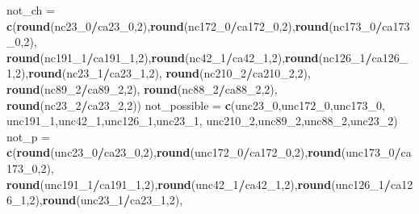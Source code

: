 \documentclass[
]{article}
\newenvironment{Shaded}{\begin{snugshade}}{\end{snugshade}}
\newcommand{\DecValTok}[1]{\textcolor[rgb]{0.00,0.00,0.81}{#1}}
\newcommand{\KeywordTok}[1]{\textcolor[rgb]{0.13,0.29,0.53}{\textbf{#1}}}
\newcommand{\NormalTok}[1]{#1}
\newcommand{\OperatorTok}[1]{\textcolor[rgb]{0.81,0.36,0.00}{\textbf{#1}}}
\newcommand{\StringTok}[1]{\textcolor[rgb]{0.31,0.60,0.02}{#1}}
\begin{document}
\begin{Shaded}
\begin{Highlighting}[]
\NormalTok{not_ch =}\StringTok{ }\KeywordTok{c}\NormalTok{(}\KeywordTok{round}\NormalTok{(nc23_}\DecValTok{0}\OperatorTok{/}\NormalTok{ca23_}\DecValTok{0}\NormalTok{,}\DecValTok{2}\NormalTok{),}\KeywordTok{round}\NormalTok{(nc172_}\DecValTok{0}\OperatorTok{/}\NormalTok{ca172_}\DecValTok{0}\NormalTok{,}\DecValTok{2}\NormalTok{),}\KeywordTok{round}\NormalTok{(nc173_}\DecValTok{0}\OperatorTok{/}\NormalTok{ca173_}\DecValTok{0}\NormalTok{,}\DecValTok{2}\NormalTok{),}
           \KeywordTok{round}\NormalTok{(nc191_}\DecValTok{1}\OperatorTok{/}\NormalTok{ca191_}\DecValTok{1}\NormalTok{,}\DecValTok{2}\NormalTok{),}\KeywordTok{round}\NormalTok{(nc42_}\DecValTok{1}\OperatorTok{/}\NormalTok{ca42_}\DecValTok{1}\NormalTok{,}\DecValTok{2}\NormalTok{),}\KeywordTok{round}\NormalTok{(nc126_}\DecValTok{1}\OperatorTok{/}\NormalTok{ca126_}\DecValTok{1}\NormalTok{,}\DecValTok{2}\NormalTok{),}\KeywordTok{round}\NormalTok{(nc23_}\DecValTok{1}\OperatorTok{/}\NormalTok{ca23_}\DecValTok{1}\NormalTok{,}\DecValTok{2}\NormalTok{),}
           \KeywordTok{round}\NormalTok{(nc210_}\DecValTok{2}\OperatorTok{/}\NormalTok{ca210_}\DecValTok{2}\NormalTok{,}\DecValTok{2}\NormalTok{), }\KeywordTok{round}\NormalTok{(nc89_}\DecValTok{2}\OperatorTok{/}\NormalTok{ca89_}\DecValTok{2}\NormalTok{,}\DecValTok{2}\NormalTok{), }\KeywordTok{round}\NormalTok{(nc88_}\DecValTok{2}\OperatorTok{/}\NormalTok{ca88_}\DecValTok{2}\NormalTok{,}\DecValTok{2}\NormalTok{), }\KeywordTok{round}\NormalTok{(nc23_}\DecValTok{2}\OperatorTok{/}\NormalTok{ca23_}\DecValTok{2}\NormalTok{,}\DecValTok{2}\NormalTok{))}
\NormalTok{not_possible =}\StringTok{ }\KeywordTok{c}\NormalTok{(unc23_}\DecValTok{0}\NormalTok{,unc172_}\DecValTok{0}\NormalTok{,unc173_}\DecValTok{0}\NormalTok{,}
\NormalTok{                 unc191_}\DecValTok{1}\NormalTok{,unc42_}\DecValTok{1}\NormalTok{,unc126_}\DecValTok{1}\NormalTok{,unc23_}\DecValTok{1}\NormalTok{,}
\NormalTok{                 unc210_}\DecValTok{2}\NormalTok{,unc89_}\DecValTok{2}\NormalTok{,unc88_}\DecValTok{2}\NormalTok{,unc23_}\DecValTok{2}\NormalTok{)}
\NormalTok{not_p =}\StringTok{ }\KeywordTok{c}\NormalTok{(}\KeywordTok{round}\NormalTok{(unc23_}\DecValTok{0}\OperatorTok{/}\NormalTok{ca23_}\DecValTok{0}\NormalTok{,}\DecValTok{2}\NormalTok{),}\KeywordTok{round}\NormalTok{(unc172_}\DecValTok{0}\OperatorTok{/}\NormalTok{ca172_}\DecValTok{0}\NormalTok{,}\DecValTok{2}\NormalTok{),}\KeywordTok{round}\NormalTok{(unc173_}\DecValTok{0}\OperatorTok{/}\NormalTok{ca173_}\DecValTok{0}\NormalTok{,}\DecValTok{2}\NormalTok{),}
          \KeywordTok{round}\NormalTok{(unc191_}\DecValTok{1}\OperatorTok{/}\NormalTok{ca191_}\DecValTok{1}\NormalTok{,}\DecValTok{2}\NormalTok{),}\KeywordTok{round}\NormalTok{(unc42_}\DecValTok{1}\OperatorTok{/}\NormalTok{ca42_}\DecValTok{1}\NormalTok{,}\DecValTok{2}\NormalTok{),}\KeywordTok{round}\NormalTok{(unc126_}\DecValTok{1}\OperatorTok{/}\NormalTok{ca126_}\DecValTok{1}\NormalTok{,}\DecValTok{2}\NormalTok{),}\KeywordTok{round}\NormalTok{(unc23_}\DecValTok{1}\OperatorTok{/}\NormalTok{ca23_}\DecValTok{1}\NormalTok{,}\DecValTok{2}\NormalTok{),}

\end{Highlighting}
\end{Shaded}
\end{document}

